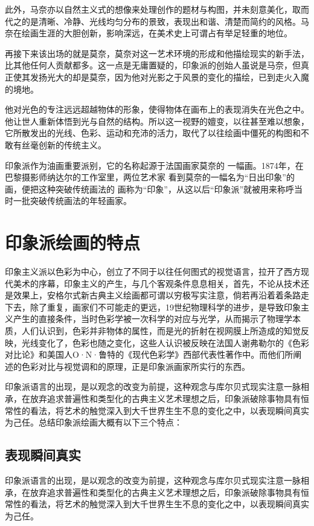 \documentclass{xcumcmart}
\begin{document}
\par 此外，马奈亦以自然主义式的想像来处理创作的题材与构图，并未刻意美化，取而代之的是清晰、冷静、光线均匀分布的景致，表现出和谐、清楚而简约的风格。马奈在绘画生涯的大胆创新，影响深远，在美术史上可谓占有举足轻重的地位。
\par 再接下来该出场的就是莫奈，莫奈对这一艺术环境的形成和他描绘现实的新手法，比其他任何人贡献都多。这一点是无庸置疑的，印象派的创始人虽说是马奈，但真正使其发扬光大的却是莫奈，因为他对光影之于风景的变化的描绘，已到走火入魔的境地。
\par 他对光色的专注远远超越物体的形象，使得物体在画布上的表现消失在光色之中。他让世人重新体悟到光与自然的结构。所以这一视野的嬗变，以往甚至难以想象，它所散发出的光线、色彩、运动和充沛的活力，取代了以往绘画中僵死的构图和不敢有丝毫创新的传统主义。
\par 印象派作为油画重要派别，它的名称起源于法国画家莫奈的 一幅画。1874年，在巴黎摄影师纳达尔的工作室里，两位艺术家 看到莫奈的一幅名为“日出印象”的画，便把这种突破传统画法的 画称为“印象”，从这以后“印象派”就被用来称呼当时一批突破传统画法的年轻画家。
\section{印象派绘画的特点}
\par 印象主义派以色彩为中心，创立了不同于以往任何图式的视觉语言，拉开了西方现代美术的序幕，印象主义的产生，与几个客观条件息息相关，首先，不论从技术还是效果上，安格尔式新古典主义绘画都可谓以穷极写实注意，倘若再沿着着条路走下去，除了重复，画家们不可能走的更远，19世纪物理科学的进步，是导致印象主义产生的直接条件，当时色彩学被一次科学的对应与光学，从而揭示了物理学本质，人们认识到，色彩并非物体的属性，而是光的折射在视网膜上所造成的知觉反映，光线变化了，色彩也随之变化\cite{2}，这些人认识被反映在法国人谢弗勒尔的《色彩对比论》和美国人O·N·鲁特的《现代色彩学》西部代表性著作中。而他们所阐述的色彩对比与视觉调和的原理，正是印象派画家所实行的东西。
\par 印象派语言的出现，是以观念的改变为前提，这种观念与库尔贝式现实注意一脉相承，在放弃追求普遍性和类型化的古典主义艺术理想之后，印象派破除事物具有恒常性的看法，将艺术的触觉深入到大千世界生生不息的变化之中，以表现瞬间真实为己任。总结印象派绘画大概有以下三个特点：
\subsection{表现瞬间真实}
\par 印象派语言的出现，是以观念的改变为前提，这种观念与库尔贝式现实注意一脉相承，在放弃追求普遍性和类型化的古典主义艺术理想之后，印象派破除事物具有恒常性的看法，将艺术的触觉深入到大千世界生生不息的变化之中，以表现瞬间真实为己任。
\end{document}
